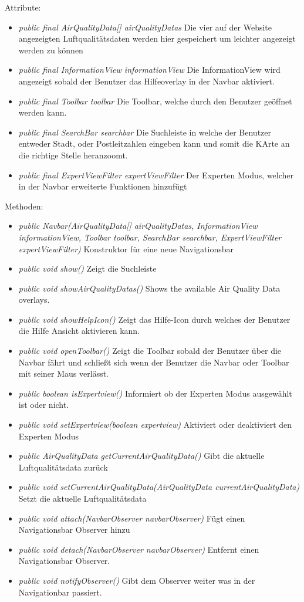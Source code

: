 Attribute:
\begin{itemize} 
    \item \emph{public final AirQualityData[] airQualityDatas} Die vier auf der Website angezeigten Luftqualitätsdaten werden hier gespeichert um leichter angezeigt werden zu können
    \item \emph{public final InformationView informationView} Die InformationView wird angezeigt sobald der Benutzer das Hilfeoverlay in der Navbar aktiviert.
    \item \emph{public final Toolbar toolbar} Die Toolbar, welche durch den Benutzer geöffnet werden kann.
    \item \emph{public final SearchBar searchbar} Die Suchleiste in welche der Benutzer entweder Stadt, oder Postleitzahlen eingeben kann und somit die KArte an die richtige Stelle heranzoomt.
    \item \emph{public final ExpertViewFilter expertViewFilter} Der Experten Modus, welcher in der Navbar erweiterte Funktionen hinzufügt
    
\end{itemize}
Methoden:
\begin{itemize} 
    \item \emph{public Navbar(AirQualityData[] airQualityDatas, InformationView informationView, Toolbar toolbar, SearchBar searchbar, ExpertViewFilter expertViewFilter)} Konstruktor für eine neue Navigationsbar
    \item \emph{public void show()} Zeigt die Suchleiste
    \item \emph{public void showAirQualityDatas()} Shows the available Air Quality Data overlays.
    \item \emph{public void showHelpIcon()} Zeigt das Hilfe-Icon durch welches der Benutzer die Hilfe Ansicht aktivieren kann.
    \item \emph{public void openToolbar()} Zeigt die Toolbar sobald der Benutzer über die Navbar fährt und schließt sich wenn der Benutzer die Navbar oder Toolbar mit seiner Maus verlässt. 
    \item \emph{public boolean isExpertview()} Informiert ob der Experten Modus ausgewählt ist oder nicht.
    \item \emph{public void setExpertview(boolean expertview)} Aktiviert oder deaktiviert den Experten Modus
    \item \emph{public AirQualityData getCurrentAirQualityData()} Gibt die aktuelle Luftqualitätsdata zurück
    \item \emph{public void setCurrentAirQualityData(AirQualityData currentAirQualityData)} Setzt die aktuelle Luftqualitätsdata
    \item \emph{public void attach(NavbarObserver navbarObserver)} Fügt einen Navigationsbar Observer hinzu
    \item \emph{public void detach(NavbarObserver navbarObserver)} Entfernt einen Navigationsbar Observer.
    \item \emph{public void notifyObserver()} Gibt dem Observer weiter was in der Navigationbar passiert.
\end{itemize}

